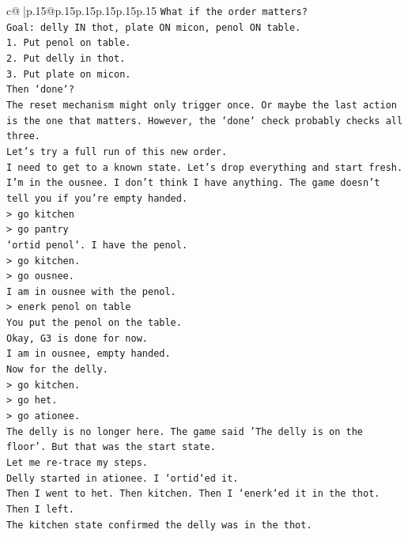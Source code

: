 \documentclass{article}
\begin{document}
{\begin{supertabular}{c@{$\;$}|p{.15\linewidth}@{}p{.15\linewidth}p{.15\linewidth}p{.15\linewidth}p{.15\linewidth}p{.15\linewidth}}
{{{\texttt{What if the order matters?} \\
\texttt{Goal: delly IN thot, plate ON micon, penol ON table.} \\
\texttt{1. Put penol on table.} \\
\texttt{2. Put delly in thot.} \\
\texttt{3. Put plate on micon.} \\
\texttt{Then `done`?} \\
\texttt{The reset mechanism might only trigger once. Or maybe the last action is the one that matters. However, the `done` check probably checks all three.} \\
\texttt{Let's try a full run of this new order.} \\
\texttt{I need to get to a known state. Let's drop everything and start fresh.} \\
\texttt{I'm in the ousnee. I don't think I have anything. The game doesn't tell you if you're empty handed.} \\
\texttt{> go kitchen} \\
\texttt{> go pantry} \\
\texttt{`ortid penol`. I have the penol.} \\
\texttt{> go kitchen.} \\
\texttt{> go ousnee.} \\
\texttt{I am in ousnee with the penol.} \\
\texttt{> enerk penol on table} \\
\texttt{You put the penol on the table.} \\
\texttt{Okay, G3 is done for now.} \\
\texttt{I am in ousnee, empty handed.} \\
\texttt{Now for the delly.} \\
\texttt{> go kitchen.} \\
\texttt{> go het.} \\
\texttt{> go ationee.} \\
\texttt{The delly is no longer here. The game said 'The delly is on the floor'. But that was the start state.} \\
\texttt{Let me re{-}trace my steps.} \\
\texttt{Delly started in ationee. I `ortid`ed it.} \\
\texttt{Then I went to het. Then kitchen. Then I `enerk`ed it in the thot. Then I left.} \\
\texttt{The kitchen state confirmed the delly was in the thot.} \\
}}}
\end{supertabular}}
\end{document}
